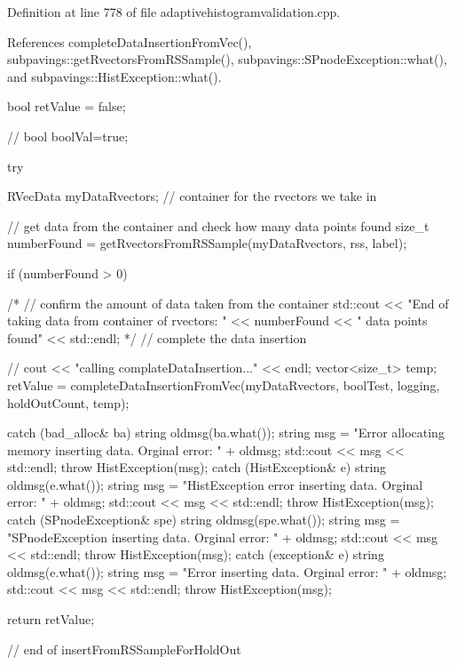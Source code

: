 \-Definition at line 778 of file adaptivehistogramvalidation.\-cpp.



\-References complete\-Data\-Insertion\-From\-Vec(), subpavings\-::get\-Rvectors\-From\-R\-S\-Sample(), subpavings\-::\-S\-Pnode\-Exception\-::what(), and subpavings\-::\-Hist\-Exception\-::what().


\begin{DoxyCode}
{
    bool retValue = false;

  //  bool boolVal=true;
    
    try {

        RVecData myDataRvectors; // container for the rvectors we take in

            // get data from the container and check how many data points found
            size_t numberFound = getRvectorsFromRSSample(myDataRvectors, rss, 
      label);


            if (numberFound > 0) {
                /*
                // confirm the amount of data taken from the container
                std::cout << "End of taking data from container of rvectors: "
                    << numberFound << " data points found" << std::endl;
                */
                // complete the data insertion

               // cout << "calling complateDataInsertion..." << endl;
          vector<size_t> temp;
                retValue = completeDataInsertionFromVec(myDataRvectors,
                                     boolTest, logging, holdOutCount, temp);
            }
      }
    
    catch (bad_alloc& ba) {
         string oldmsg(ba.what());
        string msg = "Error allocating memory inserting data.  Orginal error: "
                                            + oldmsg;
        std::cout << msg << std::endl;
        throw HistException(msg);
    }
    catch (HistException& e) {
        string oldmsg(e.what());
        string msg = "HistException error inserting data.  Orginal error: "
                                    + oldmsg;
        std::cout << msg << std::endl;
        throw HistException(msg);
    }
    catch (SPnodeException& spe) {
        string oldmsg(spe.what());
        string msg = "SPnodeException inserting data.  Orginal error: " + 
      oldmsg;
        std::cout << msg << std::endl;
        throw HistException(msg);
    }
    catch (exception& e) {
        string oldmsg(e.what());
        string msg = "Error inserting data.  Orginal error: " + oldmsg;
        std::cout << msg << std::endl;
        throw HistException(msg);
    }

    return retValue;
} // end of insertFromRSSampleForHoldOut
\end{DoxyCode}
